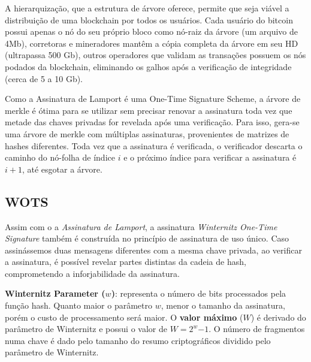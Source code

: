 \documentclass[12pt, a4paper]{report}
\begin{document}
A hierarquização, que a estrutura de árvore oferece, permite que seja viável a distribuição de uma blockchain por todos os usuários. Cada usuário do bitcoin possui apenas o nó do seu próprio bloco como nó-raiz da árvore (um arquivo de 4Mb), corretoras e mineradores mantêm a cópia completa da árvore em seu HD (ultrapassa 500 Gb), outros operadores que validam as transações possuem os nós podados da blockchain, eliminando os galhos após a verificação de integridade (cerca de 5 a 10 Gb).

Como a Assinatura de Lamport é uma One-Time Signature Scheme, a árvore de merkle é ótima para se utilizar sem precisar renovar a assinatura toda vez que metade das chaves privadas for revelada após uma verificação. Para isso, gera-se uma árvore de merkle com múltiplas assinaturas, provenientes de matrizes de hashes diferentes. Toda vez que a assinatura é verificada, o verificador descarta o caminho do nó-folha de índice $i$ e o próximo índice para verificar a assinatura é $i+1$, até esgotar a árvore.

\subsection{WOTS}
Assim com o a \textit{Assinatura de Lamport}, a assinatura \textit{Winternitz One-Time Signature} também é construída no princípio de assinatura de uso único. Caso assinássemos duas mensagens diferentes com a mesma chave privada, ao verificar a assinatura, é possível revelar partes distintas da cadeia de hash, comprometendo a inforjabilidade da assinatura.

\textbf{Winternitz Parameter ($w$)}: representa o número de bits processados pela função hash. Quanto maior o parâmetro $w$, menor o tamanho da assinatura, porém o custo de processamento será maior. O \textbf{valor máximo} ($W$) é derivado do parâmetro de Winternitz e possui o valor de $W=2^w$\color{red}$-1$\color{black}. O número de fragmentos numa chave é dado pelo tamanho do resumo criptográficos dividido pelo parâmetro de Winternitz.
\end{document}
